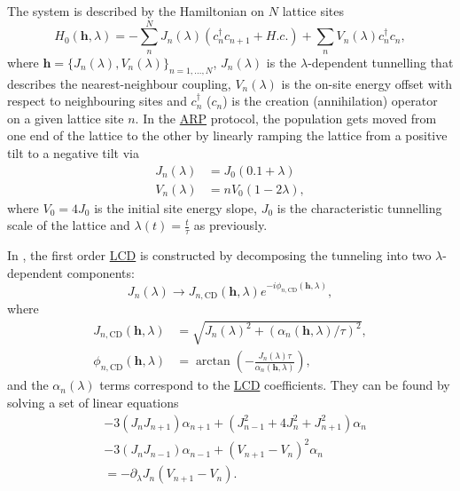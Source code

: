 \documentclass[a4paper,oneside,11pt]{book}
\newcommand{\hbb}{\boldsymbol{h}}
\newcommand{\acrref}[1]{\hyperref[acr:#1]{#1}}
\begin{document}
The system is described by the Hamiltonian on $N$ lattice sites
\begin{equation}\label{eq:lattice_hamiltonian}
    H_0(\hbb, \lambda) = - \sum_n^N J_n(\lambda)(c_n^{\dag}c_{n+1} + H.c.) + \sum_n V_n(\lambda) c_n^{\dag}c_n,
\end{equation}
where $\hbb = \{ J_n(\lambda), V_n(\lambda)\}_{n = 1, ..., N}$, $J_n(\lambda)$ is the $\lambda$-dependent tunnelling that describes the nearest-neighbour coupling, $V_n(\lambda)$ is the on-site energy offset with respect to neighbouring sites and $c_n^{\dag}$ ($c_{n}$) is the creation (annihilation) operator on a given lattice site $n$. In the \acrref{ARP} protocol, the population gets moved from one end of the lattice to the other by linearly ramping the lattice from a positive tilt to a negative tilt via
\begin{equation} \label{eq:J_lattice}
    \begin{aligned}
        J_n(\lambda) &= J_0(0.1 + \lambda) \\
        V_n(\lambda) &= n V_0 (1 - 2\lambda),
    \end{aligned}
\end{equation}
where $V_0 = 4J_0$ is the initial site energy slope, $J_0$ is the characteristic tunnelling scale of the lattice and $\lambda(t) = \frac{t}{\tau}$ as previously.

In \cite{meier_counterdiabatic_2020}, the first order \acrref{LCD} is constructed by decomposing the tunneling into two $\lambda$-dependent components:
\begin{equation}\label{eq:tunneling}
    J_n(\lambda) \rightarrow J_{n, \mathrm{CD}}(\hbb, \lambda) e^{-i\phi_{n, \mathrm{CD}}(\hbb, \lambda)},
\end{equation}
where
\begin{equation}\label{eq:J_cd}
    \begin{aligned}
    J_{n, \mathrm{CD}}(\hbb, \lambda) &= \sqrt{J_n(\lambda)^2 + (\alpha_n(\hbb, \lambda)/\tau)^2}, \\
    \phi_{n, \mathrm{CD}}(\hbb, \lambda)  &= \arctan\left(-\frac{J_n(\lambda)\tau}{\alpha_n(\hbb, \lambda)}\right),
    \end{aligned}
\end{equation}
and the $\alpha_n(\lambda)$ terms correspond to the \acrref{LCD} coefficients. They can be found by solving a set of linear equations
\begin{equation}
    \begin{aligned}
        &-3(J_n J_{n+1})\alpha_{n+1} + (J_{n-1}^2 + 4J^2_n + J_{n+1}^2)\alpha_n \\ &- 3(J_n J_{n-1})\alpha_{n-1} + (V_{n+1} - V_n)^2 \alpha_n \\ &= -\partial_{\lambda}J_n (V_{n+1} - V_{n}).
    \end{aligned}
\end{equation}
\end{document}
